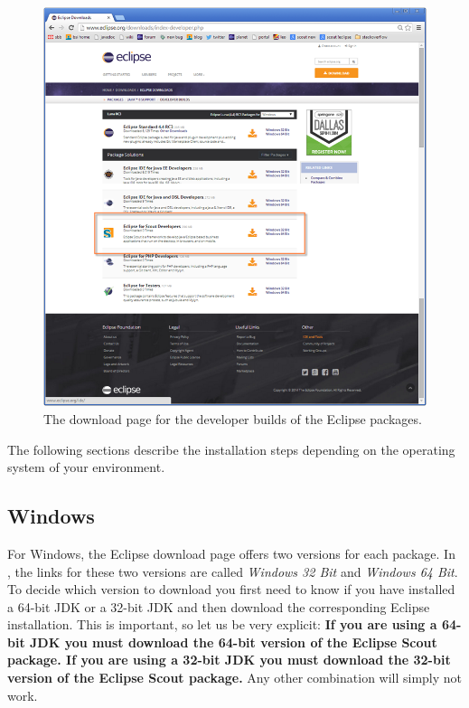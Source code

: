 \documentclass[a4paper,10pt,twoside]{book}
\begin{document}
\begin{figure}
\includegraphics[width=15cm]{scout_download.png}
\caption{The download page for the developer builds of the Eclipse packages.}
\end{figure}

The following sections describe the installation steps depending on the operating system of your environment.

\subsection{Windows}

For Windows, the Eclipse download page offers two versions for each package.
In , the links for these two versions are called \textit{Windows 32 Bit} and \textit{Windows 64 Bit}.
To decide which version to download you first need to know if you have installed a 64-bit JDK or a 32-bit JDK and then download the corresponding Eclipse installation.
This is important, so let us be very explicit: \textbf{If you are using a 64-bit JDK you must download the 64-bit version of the Eclipse Scout package. 
If you are using a 32-bit JDK you must download the 32-bit version of the Eclipse Scout package.}
Any other combination will simply not work.
\end{document}
